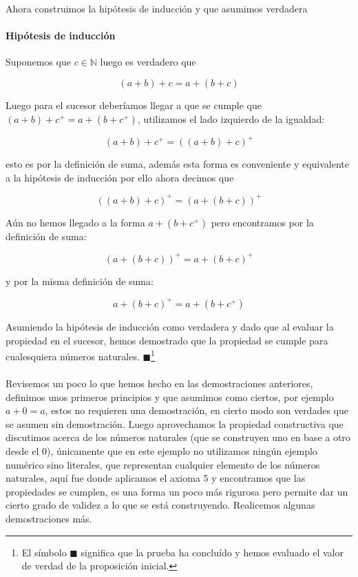 \documentclass{article}
\begin{document}
Ahora construimos la hipótesis de inducción y que asumimos verdadera
\paragraph{Hipótesis de inducción} Suponemos que $c \in \mathbb{N}$ luego es verdadero que

$$(a + b) + c = a + (b + c)$$

Luego para el sucesor deberíamos llegar a que se cumple que $(a + b) + c^+ = a + (b + c^+)$, utilizamos el lado izquierdo de la igualdad:

    $$(a + b) + c^+ = ((a + b) + c)^+$$

esto es por la definición de suma, además esta forma es conveniente y equivalente a la hipótesis de inducción por ello ahora decimos que

$$((a + b) + c)^+ = (a + (b + c))^+$$

Aún no hemos llegado a la forma $a + (b + c^+)$ pero encontramos por la definición de suma:

$$(a + (b + c))^+ = a + (b + c)^+$$

y por la misma definición de suma:

$$a + (b + c)^+ = a + (b + c^+)$$

Asumiendo la hipótesis de inducción como verdadera y dado que al evaluar la propiedad en el sucesor, hemos demostrado que la propiedad se cumple para cualesquiera números naturales. $\blacksquare$\footnote{El símbolo $\blacksquare$ significa que la prueba ha concluído y hemos evaluado el valor de verdad de la proposición inicial.}

\paragraph{} Revisemos un poco lo que hemos hecho en las demostraciones anteriores, definimos unos primeros principios y que asumimos como ciertos, por ejemplo $a + 0 = a$, estos no requieren una demostración, en cierto modo son verdades que se asumen sin demostración. Luego aprovechamos la propiedad constructiva que discutimos acerca de los números naturales (que se construyen uno en base a otro desde el 0), únicamente que en este ejemplo no utilizamos ningún ejemplo numérico sino literales, que representan cualquier elemento de los números naturales, aquí fue donde aplicamos el axioma 5 y encontramos que las propiedades se cumplen, es una forma un poco más rigurosa pero permite dar un cierto grado de validez a lo que se está construyendo. Realicemos algunas demostraciones más.
\end{document}
